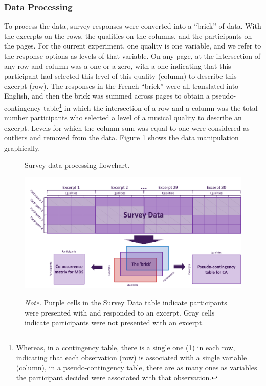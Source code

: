 \documentclass[
  english,
  man,floatsintext]{apa6}
\begin{document}
\hypertarget{data-processing}{%
\subsubsection{Data Processing}\label{data-processing}}

To process the data, survey responses were converted into a ``brick'' of data. With the excerpts on the rows, the qualities on the columns, and the participants on the pages. For the current experiment, one quality is one variable, and we refer to the response options as levels of that variable. On any page, at the intersection of any row and column was a one or a zero, with a one indicating that this participant had selected this level of this quality (column) to describe this excerpt (row). The responses in the French ``brick'' were all translated into English, and then the brick was summed across pages to obtain a pseudo-contingency table\footnote{Whereas, in a contingency table, there is a single one (1) in each row, indicating that each observation (row) is associated with a single variable (column), in a pseudo-contingency table, there are as many ones as variables the participant decided were associated with that observation.} in which the intersection of a row and a column was the total number participants who selected a level of a musical quality to describe an excerpt. Levels for which the column sum was equal to one were considered as outliers and removed from the data. Figure \ref{fig:dataflow} shows the data manipulation graphically.

\begin{figure}   
  \centering  
  \caption{Survey data processing flowchart.}
    \includegraphics[width=0.75\columnwidth]{./Music-Descriptor-Space_files/figure-latex/dataflow.png}
  \label{fig:dataflow}
  \caption*{\footnotesize \textit{Note.} Purple cells in the Survey Data table indicate participants were presented with and responded to an excerpt. Gray cells indicate participants were not presented with an excerpt. }
\end{figure}
\end{document}
